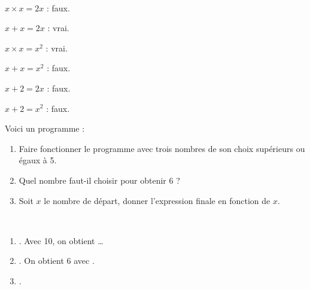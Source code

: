 \begin{colonne*exercice}
\begin{corrige}
\ \\ [-5mm]
   \begin{colenumerate}{2}
      \item $x\times x = 2x$ : {\blue faux}.
      \item $x+x = 2x$ : {\blue vrai}.
      \item $x\times x = x^{2}$ : {\blue vrai}.
      \item $x+x =x^{2}$ : {\blue faux}.
      \item $x+2 =2x$ : {\blue faux}.
      \item $x+2=x^{2}$ : {\blue faux}.
   \end{colenumerate}
\end{corrige}

\bigskip


\begin{exercice} %
   Voici un programme :
   \begin{center}
   \end{center}
   \begin{enumerate}
      \item Faire fonctionner le programme avec trois nombres de son choix supérieurs ou égaux à 5.
      \item Quel nombre faut-il choisir pour obtenir 6 ?
      \item Soit $x$ le nombre de départ, donner l'expression finale en fonction de $x$.
   \end{enumerate}
\end{exercice}

\begin{corrige}
   \ \\ [-5mm]
   \begin{enumerate}
      \item {}. Avec 10, on obtient {} \dots
      \item {}. On obtient 6 avec {}.
      \item {}.
   \end{enumerate}
\end{corrige}

\bigskip



\end{colonne*exercice}

